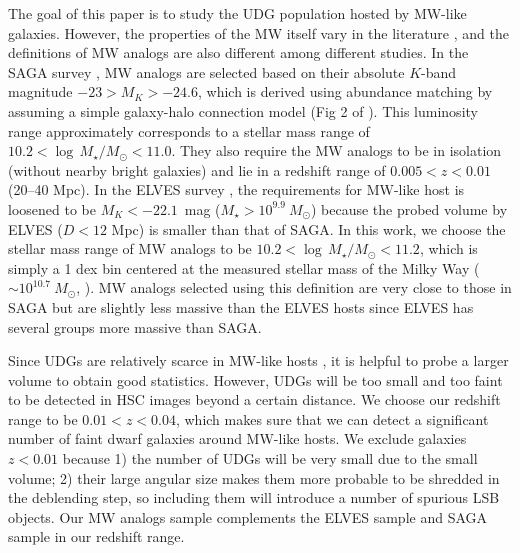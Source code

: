 \documentclass[twocolumn,astrosymb,twocolappendix]{aastex631}
\begin{document}
\begin{CJK*}{UTF8}{gbsn}
The goal of this paper is to study the UDG population hosted by MW-like galaxies. However, the properties of the MW itself vary in the literature \citep{Licquia2015,Bland-Hawthorn2016}, and the definitions of MW analogs are also different among different studies. In the SAGA survey \citep{SAGA-I,SAGA-II}, MW analogs are selected based on their absolute $K$-band magnitude $-23 > M_K > -24.6$, which is derived using abundance matching by assuming a simple galaxy-halo connection model (Fig 2 of \citealt{SAGA-I}). This luminosity range approximately corresponds to a stellar mass range of $10.2 < \log\, M_\star/M_\odot < 11.0$. They also require the MW analogs to be in isolation (without nearby bright galaxies) and lie in a redshift range of $0.005 < z < 0.01$ (20--40 Mpc). In the ELVES survey \citep{ELVES-I,ELVES-II,CarlstenELVES2022}, the requirements for MW-like host is loosened to be $M_K < -22.1$~mag ($M_\star > 10^{9.9}\ M_\odot$) because the probed volume by ELVES ($D<12$ Mpc) is smaller than that of SAGA. In this work, we choose the stellar mass range of MW analogs to be $10.2 < \log\, M_\star/M_\odot < 11.2$, which is simply a 1 dex bin centered at the measured stellar mass of the Milky Way ($\sim 10^{10.7}\ M_\odot$, \citealt{Licquia2015}). MW analogs selected using this definition are very close to those in SAGA but are slightly less massive than the ELVES hosts since ELVES has several groups more massive than SAGA.

Since UDGs are relatively scarce in MW-like hosts \citep{SAGA-II,CarlstenELVES2022}, it is helpful to probe a larger volume to obtain good statistics. However, UDGs will be too small and too faint to be detected in HSC images beyond a certain distance. We choose our redshift range to be $0.01 < z < 0.04$, which makes sure that we can detect a significant number of faint dwarf galaxies around MW-like hosts. We exclude galaxies $z<0.01$ because 1) the number of UDGs will be very small due to the small volume; 2) their large angular size makes them more probable to be shredded in the deblending step, so including them will introduce a number of spurious LSB objects. Our MW analogs sample complements the ELVES sample and SAGA sample in our redshift range. 


\end{CJK*}
\end{document}
